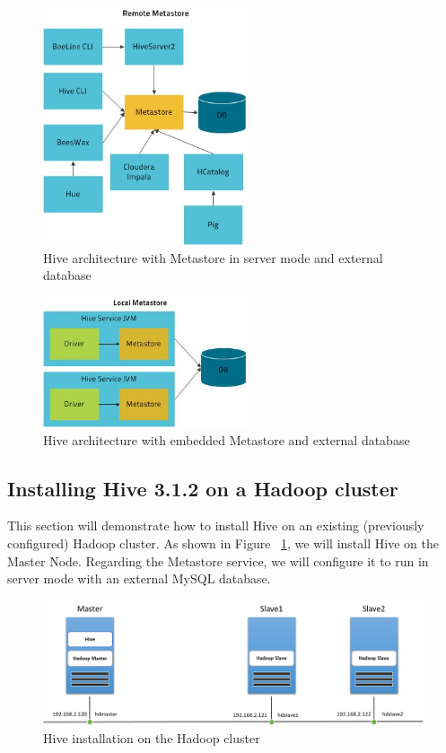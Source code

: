 \documentclass[12pt,english]{book}
\begin{document}


\begin{figure}[H]
	\centering
	\includegraphics[width=6cm]{hiveRemoteMetaStore.png}
	\caption[Hive architecture with Metastore in server mode and external database]{Hive architecture with Metastore in server mode and external database}
\end{figure}

\begin{figure}[H]
	\centering
	\includegraphics[width=6cm]{hiveLocalMetaStore.png}
	\caption[Hive architecture with embedded Metastore and external database]{Hive architecture with embedded Metastore and external database}
\end{figure}

\subsection{Installing Hive 3.1.2 on a Hadoop cluster}

This section will demonstrate how to install Hive on an existing (previously configured) Hadoop cluster.
As shown in Figure ~\ref{fig:hiveInstallation}, we will install Hive on the Master Node.
Regarding the Metastore service, we will configure it to run in server mode with an external MySQL database.

\begin{figure}[H]
	\centering
	\includegraphics[width=\linewidth]{hiveCluster.png}
	\caption{Hive installation on the Hadoop cluster}
        \label{fig:hiveInstallation}
\end{figure}
\end{document}
